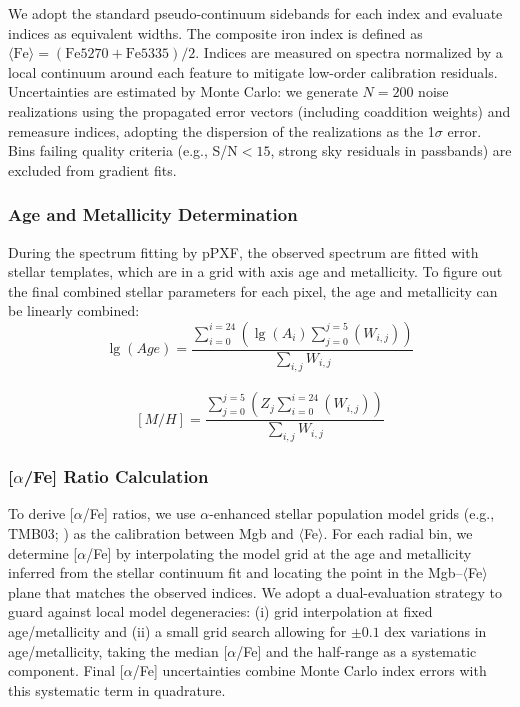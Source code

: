 \documentclass[linenumbers,trackchanges,twocolumn]{aastex631}
\begin{document}
We adopt the standard pseudo-continuum sidebands for each index and evaluate indices as equivalent widths. The composite iron index is defined as $\langle\mathrm{Fe}\rangle = (\mathrm{Fe}5270+\mathrm{Fe}5335)/2$. Indices are measured on spectra normalized by a local continuum around each feature to mitigate low-order calibration residuals. Uncertainties are estimated by Monte Carlo: we generate $N=200$ noise realizations using the propagated error vectors (including coaddition weights) and remeasure indices, adopting the dispersion of the realizations as the 1$\sigma$ error. Bins failing quality criteria (e.g., S/N$<15$, strong sky residuals in passbands) are excluded from gradient fits.

\subsubsection{Age and Metallicity Determination}

During the spectrum fitting by pPXF, the observed spectrum are fitted with stellar templates, which are in a grid with axis age and metallicity. To figure out the final combined stellar parameters for each pixel, the age and metallicity can be linearly combined: $$\lg(Age)=\frac{\sum_{i=0}^{i=24}(\lg(A_{i})\sum_{j=0}^{j=5}{(W_{i,j})})}{\sum_{i,j}W_{i,j}}$$\\$$[M/H] = \frac{\sum_{j=0}^{j=5}(Z_j \sum_{i=0}^{i=24}(W_{i,j}))}{\sum_{i,j} W_{i,j}}$$

\subsubsection{[$\alpha$/Fe] Ratio Calculation}

To derive [$\alpha$/Fe] ratios, we use $\alpha$-enhanced stellar population model grids (e.g., TMB03; \citealt{Thomas2003}) as the calibration between Mgb and $\langle$Fe$\rangle$. For each radial bin, we determine [$\alpha$/Fe] by interpolating the model grid at the age and metallicity inferred from the stellar continuum fit and locating the point in the Mgb--$\langle$Fe$\rangle$ plane that matches the observed indices. We adopt a dual-evaluation strategy to guard against local model degeneracies: (i) grid interpolation at fixed age/metallicity and (ii) a small grid search allowing for $\pm0.1$ dex variations in age/metallicity, taking the median [$\alpha$/Fe] and the half-range as a systematic component. Final [$\alpha$/Fe] uncertainties combine Monte Carlo index errors with this systematic term in quadrature.
\end{document}
